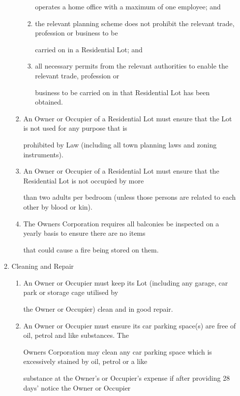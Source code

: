 \documentclass{article}
\begin{document}
\begin{enumerate}[label=\arabic*.]
\begin{enumerate}[label=\arabic{enumi}.\arabic*.]
\begin{enumerate}[label=(\arabic*)]
\begin{enumerate}[label=(\alph*)]
\newpage

operates a home office with a maximum of one employee; and 

\item  the relevant planning scheme does not prohibit the relevant trade, profession or business to be 

carried on in a Residential Lot; and 

\item  all necessary permits from the relevant authorities to enable the relevant trade, profession or 

business to be carried on in that Residential Lot has been obtained. 

\end{enumerate}
\item  An Owner or Occupier of a Residential Lot must ensure that the Lot is not used for any purpose that is 

prohibited by Law (including all town planning laws and zoning instruments). 

\item  An Owner or Occupier of a Residential Lot must ensure that the Residential Lot is not occupied by more 

than two adults per bedroom (unless those persons are related to each other by blood or kin). 

\item  The Owners Corporation requires all balconies be inspected on a yearly basis to ensure there are no items 

that could cause a fire being stored on them. 

\end{enumerate}
\item  Cleaning and Repair 

\begin{enumerate}[label=(\arabic*)]
\item  An Owner or Occupier must keep its Lot (including any garage, car park or storage cage utilised by 

the Owner or Occupier) clean and in good repair. 

\item  An Owner or Occupier must ensure its car parking space(s) are free of oil, petrol and like substances. The 

Owners Corporation may clean any car parking space which is excessively stained by oil, petrol or a like 

substance at the Owner's or Occupier's expense if after providing 28 days’ notice the Owner or Occupier 


\end{enumerate}
\end{enumerate}
\end{enumerate}
\end{document}
